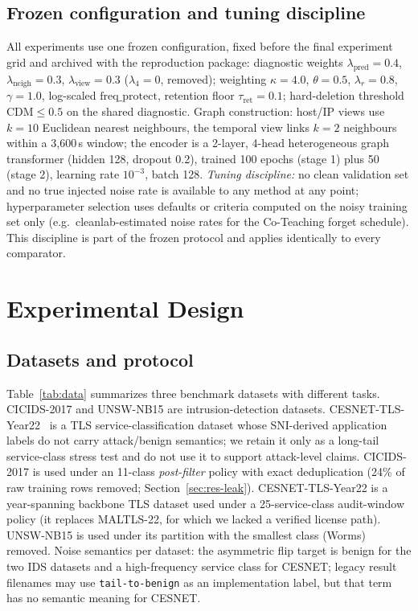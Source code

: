 \documentclass[pdflatex,referee,lineno,sn-basic,Numbered]{sn-jnl}
\begin{document}
\subsection{Frozen configuration and tuning discipline}
\label{sec:frozen-config}
All experiments use one frozen configuration, fixed before the final experiment
grid and archived with the reproduction package: diagnostic weights
$\lambda_{\text{pred}}{=}0.4$, $\lambda_{\text{neigh}}{=}0.3$,
$\lambda_{\text{view}}{=}0.3$ ($\lambda_4{=}0$, removed); weighting
$\kappa{=}4.0$, $\theta{=}0.5$, $\lambda_r{=}0.8$, $\gamma{=}1.0$,
log-scaled $\text{freq\_protect}$, retention floor $\tau_{\text{ret}}{=}0.1$;
hard-deletion threshold $\mathrm{CDM}\le0.5$ on the shared diagnostic.
Graph construction: host/IP views use $k{=}10$ Euclidean nearest neighbours,
the temporal view links $k{=}2$ neighbours within a 3{,}600\,s window; the
encoder is a 2-layer, 4-head heterogeneous graph transformer (hidden 128,
dropout 0.2), trained 100 epochs (stage 1) plus 50 (stage 2), learning rate
$10^{-3}$, batch 128. \emph{Tuning discipline:} no clean validation set and no
true injected noise rate is available to any method at any point; hyperparameter
selection uses defaults or criteria computed on the noisy training set only
(e.g.\ cleanlab-estimated noise rates for the Co-Teaching forget schedule).
This discipline is part of the frozen protocol and applies identically to every
comparator.
\section{Experimental Design}
\label{sec:exp}
\subsection{Datasets and protocol}
Table~\ref{tab:data} summarizes three benchmark datasets with different tasks.
CICIDS-2017 and UNSW-NB15 are intrusion-detection datasets. CESNET-TLS-Year22~\cite{hynek2024zenodo}
is a TLS service-classification dataset whose SNI-derived application labels do
not carry attack/benign semantics; we retain it only as a long-tail service-class
stress test and do not use it to support attack-level claims. CICIDS-2017 is used under
an 11-class \emph{post-filter} policy with exact deduplication (24\% of raw
training rows removed; Section~\ref{sec:res-leak}). CESNET-TLS-Year22 is a
year-spanning backbone TLS dataset used under a 25-service-class audit-window policy (it
replaces MALTLS-22, for which we lacked a verified license path). UNSW-NB15 is
used under its partition with the smallest class (Worms) removed. Noise
semantics per dataset: the asymmetric flip target is benign for the two IDS
datasets and a high-frequency service class for CESNET; legacy result filenames
may use \texttt{tail-to-benign} as an implementation label, but that term has no
semantic meaning for CESNET.
\end{document}

